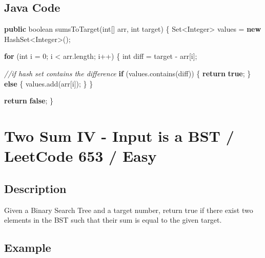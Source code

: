 \documentclass[]{book}
\newenvironment{Shaded}{\begin{snugshade}}{\end{snugshade}}
\newcommand{\BuiltInTok}[1]{#1}
\newcommand{\CommentTok}[1]{\textcolor[rgb]{0.56,0.35,0.01}{\textit{#1}}}
\newcommand{\DataTypeTok}[1]{\textcolor[rgb]{0.13,0.29,0.53}{#1}}
\newcommand{\DecValTok}[1]{\textcolor[rgb]{0.00,0.00,0.81}{#1}}
\newcommand{\FunctionTok}[1]{\textcolor[rgb]{0.00,0.00,0.00}{#1}}
\newcommand{\KeywordTok}[1]{\textcolor[rgb]{0.13,0.29,0.53}{\textbf{#1}}}
\newcommand{\NormalTok}[1]{#1}
\begin{document}
\hypertarget{java-code-1}{%
\subsection{Java Code}\label{java-code-1}}

\begin{Shaded}
\begin{Highlighting}[]
\KeywordTok{public} \DataTypeTok{boolean} \FunctionTok{sumsToTarget}\NormalTok{(}\DataTypeTok{int}\NormalTok{[] arr, }\DataTypeTok{int}\NormalTok{ target) \{}
    \BuiltInTok{Set}\NormalTok{<}\BuiltInTok{Integer}\NormalTok{> values = }\KeywordTok{new} \BuiltInTok{HashSet}\NormalTok{<}\BuiltInTok{Integer}\NormalTok{>();}

    \KeywordTok{for}\NormalTok{ (}\DataTypeTok{int}\NormalTok{ i = }\DecValTok{0}\NormalTok{; i < arr.}\FunctionTok{length}\NormalTok{; i++) \{}
        \DataTypeTok{int}\NormalTok{ diff = target - arr[i];}

        \CommentTok{//if hash set contains the difference}
        \KeywordTok{if}\NormalTok{ (values.}\FunctionTok{contains}\NormalTok{(diff)) \{}
            \KeywordTok{return} \KeywordTok{true}\NormalTok{;}
\NormalTok{        \} }\KeywordTok{else}\NormalTok{ \{}
\NormalTok{            values.}\FunctionTok{add}\NormalTok{(arr[i]);}
\NormalTok{        \}}
\NormalTok{    \}}

    \KeywordTok{return} \KeywordTok{false}\NormalTok{;}
\NormalTok{\}}
\end{Highlighting}
\end{Shaded}

\hypertarget{two-sum-iv---input-is-a-bst-leetcode-653-easy}{%
\section{Two Sum IV - Input is a BST / LeetCode 653 / Easy}\label{two-sum-iv---input-is-a-bst-leetcode-653-easy}}

\hypertarget{description-3}{%
\subsection{Description}\label{description-3}}

Given a Binary Search Tree and a target number, return true if there exist two elements in the BST such that their sum
is equal to the given target.

\hypertarget{example-2}{%
\subsection{Example}\label{example-2}}
\end{document}
